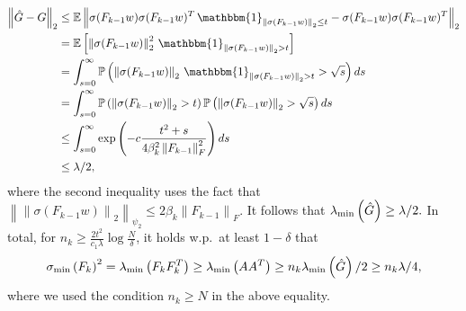 \documentclass[11pt]{article}
\newcommand{\E}{\mathbb{E}}
\newcommand{\bigexp}[1]{\exp\left(#1\right)}
\newcommand{\norm}[1]{\left\|#1\right\|}
\newcommand{\svmin}[1]{\sigma_{\rm min}\left(#1\right)}
\newcommand{\evmin}[1]{\lambda_{\rm min}\left(#1\right)}
\def\PP{\mathbb{P}}
\begin{document}
    \begin{align*}
	\norm{\hat{G}-G}_2
	&\leq \E\norm{\sigma(F_{k-1}w)\sigma(F_{k-1}w)^T\, \mathbbm{1}_{\norm{\sigma(F_{k-1}w)}_2\leq t} - \sigma(F_{k-1}w)\sigma(F_{k-1}w)^T}_2 \\
	&= \E\left[ \norm{\sigma(F_{k-1}w)}_2^2 \, \mathbbm{1}_{\norm{\sigma(F_{k-1}w)}_2>t} \right]\\
	&= \int_{s=0}^{\infty} \PP\left( \norm{\sigma(F_{k-1}w)}_2 \, \mathbbm{1}_{\norm{\sigma(F_{k-1}w)}_2>t} > \sqrt{s} \right) ds\\
	&= \int_{s=0}^{\infty} \PP\left( \norm{\sigma(F_{k-1}w)}_2>t \right) \PP\left( \norm{\sigma(F_{k-1}w)}_2 > \sqrt{s} \right) ds\\
	&\leq \int_{s=0}^{\infty} \bigexp{-c\frac{t^2 + s}{4\beta_k^2\norm{F_{k-1}}_F^2}} ds\\
	&\leq \lambda/2 ,
    \end{align*}
    where the second inequality uses the fact that $\norm{\norm{\sigma(F_{k-1}w)}_2}_{\psi_2}\leq 2\beta_k\norm{F_{k-1}}_F.$
    It follows that $\evmin{\hat{G}}\geq\lambda/2.$
    In total, for $n_k\geq \frac{2 t^2}{c_1\lambda} \log\frac{N}{\delta}$, it holds w.p.\ at least $1-\delta$ that
    \begin{align*}
	\svmin{F_k}^2
	=\evmin{F_kF_k^T}
	\geq \evmin{AA^T}
	\geq n_k \evmin{\hat{G}}/2
	\geq n_k \lambda/4,
    \end{align*}
    where we used the condition $n_k\geq N$ in the above equality.
\end{document}
